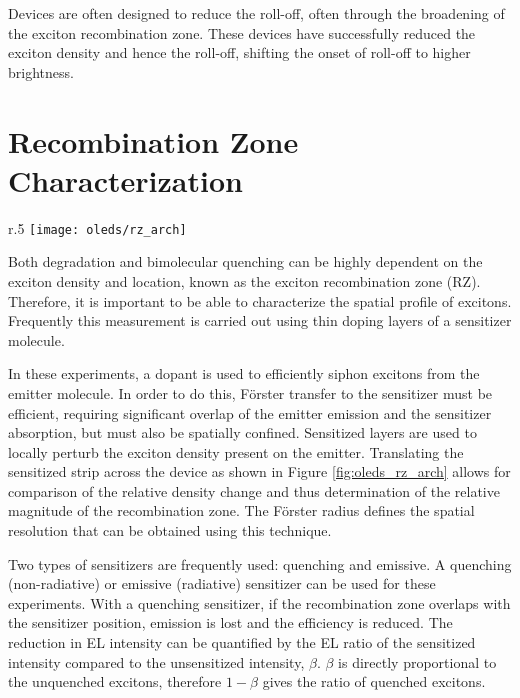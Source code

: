 \documentclass[../thesis.tex]{subfiles}
\begin{document}
Devices are often designed to reduce the roll-off, often through the broadening of the exciton recombination zone.\supercite{Wang2015,Murawski2014,Inoue2016,Soofi2017,Chopra2010,Reineke2007a,Lee2009b,Su2008a,Zang2008}
These devices have successfully reduced the exciton density and hence the roll-off, shifting the onset of roll-off to higher brightness.

\section{Recombination Zone Characterization}\label{sec:rz_measurement}
\begin{wrapfigure}{r}{.5\textwidth}
\texttt{[image: oleds/rz\_arch]}
\caption{Device architecture for the measurement of the exciton recombination zone.  The curly brace indicates the device stack.  Figure taken from \textcite{Erickson2013a}}
\label{fig:oleds_rz_arch}
\end{wrapfigure}
Both degradation and bimolecular quenching can be highly dependent on the exciton density and location, known as the exciton recombination zone (RZ).\supercite{Giebink2006,Giebink2008a,Giebink2008c,Giebink2009a,Reineke2007,Hershey2016,Hershey2017,Bangsund2018}
Therefore, it is important to be able to characterize the spatial profile of excitons.
Frequently this measurement is carried out using thin doping layers of a sensitizer molecule.\supercite{Reineke2007a,Coburn2016a,Coburn2017,Erickson2013a,Hershey2017,Bangsund2018}

In these experiments, a dopant is used to efficiently siphon excitons from the emitter molecule.
In order to do this, F\"{o}rster transfer to the sensitizer must be efficient, requiring significant overlap of the emitter emission and the sensitizer absorption, but must also be spatially confined.
Sensitized layers are used to locally perturb the exciton density present on the emitter.
Translating the sensitized strip across the device as shown in Figure \ref{fig:oleds_rz_arch} allows for comparison of the relative density change and thus determination of the relative magnitude of the recombination zone.
The F\"{o}rster radius defines the spatial resolution that can be obtained using this technique.

Two types of sensitizers are frequently used: quenching and emissive.
A quenching (non-radiative) or emissive (radiative) sensitizer can be used for these experiments.
With a quenching sensitizer, if the recombination zone overlaps with the sensitizer position, emission is lost and the efficiency is reduced.
The reduction in EL intensity can be quantified by the EL ratio of the sensitized intensity compared to the unsensitized intensity, $\beta$.
$\beta$ is directly proportional to the unquenched excitons, therefore $1-\beta$ gives the ratio of quenched excitons.
\end{document}

